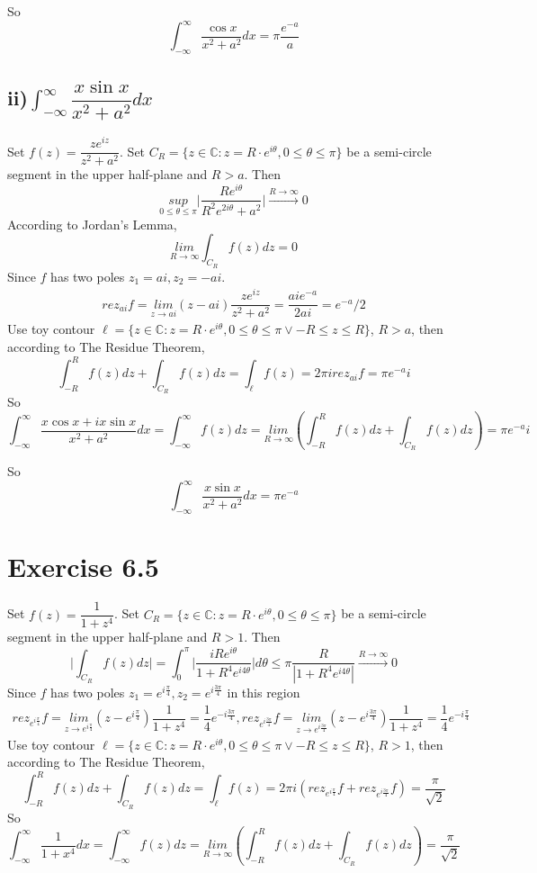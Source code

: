 \documentclass[a4paper,12pt,titlepage]{article}
\begin{document}
So $$\int_{-\infty}^{\infty}\dfrac{\cos x}{x^2+a^2}dx=\pi \dfrac{e^{-a}}{a}$$

\subsection*{ii)$\int_{-\infty}^{\infty}  \dfrac{x\sin x}{x^2+a^2}dx$}
Set $f(z)=\dfrac{ze^{iz}}{z^2+a^2}$. 
Set $C_R = \lbrace z \in \mathbb{C}: z = R\cdot e^{i\theta}, 0 \leqslant \theta \leqslant \pi\rbrace$ be a semi-circle segment in the upper half-plane and $R>a$. Then
$$\underset{0\leqslant \theta\leqslant\pi}{sup}
\big|\dfrac{Re^{i\theta}}{R^2e^{2i\theta}+a^2}\big|\xrightarrow{R\rightarrow\infty}0$$
According to Jordan's Lemma, 
$$\underset{R\rightarrow \infty}{lim}\int_{C_R}f(z)dz=0$$
Since $f$ has two poles $z_1=ai,z_2=-ai$.
\begin{align*}
rez_{ai}f=\underset{z\rightarrow ai}{lim}
(z-ai)\dfrac{ze^{iz}}{z^2+a^2}=\dfrac{aie^{-a}}{2ai}=e^{-a}/2
\end{align*}
Use toy contour $\ell= \lbrace z \in \mathbb{C}: z = R\cdot e^{i\theta}, 0 \leqslant \theta \leqslant \pi \vee -R\leqslant z\leqslant R\rbrace$, $R>a$, then according to The Residue Theorem, 
$$\int_{-R}^Rf(z)dz+\int_{C_R}f(z)dz=\int_{\ell}f(z)=2\pi irez_{ai}f=\pi e^{-a}i$$
So
$$\int_{-\infty}^{\infty}\dfrac{x\cos x+ix\sin x}{x^2+a^2}dx=\int_{-\infty}^{\infty}f(z)dz=\underset{R\rightarrow \infty}{lim}(\int_{-R}^Rf(z)dz+\int_{C_R}f(z)dz)=\pi e^{-a}i$$

So $$\int_{-\infty}^{\infty}\dfrac{x\sin x}{x^2+a^2}dx=\pi e^{-a}$$

\section*{Exercise 6.5}
Set $f(z)=\dfrac{1}{1+z^4}$. 
Set $C_R = \lbrace z \in \mathbb{C}: z = R\cdot e^{i\theta}, 0 \leqslant \theta \leqslant \pi\rbrace$ be a semi-circle segment in the upper half-plane and $R>1$. Then
$$\Big|\int_{C_R}f(z)dz\Big|=\int_0^{\pi}\Big|\dfrac{iRe^{i\theta}}{1+R^4e^{i4\theta}}\Big|d\theta\leqslant\pi\dfrac{R}{|1+R^4e^{i4\theta}|} \xrightarrow{R\rightarrow\infty}0$$
Since $f$ has two poles $z_1=e^{i\frac{\pi}{4}},z_2=e^{i\frac{3\pi}{4}}$ in this region
\begin{align*}
rez_{e^{i\frac{\pi}{4}}}f=\underset{z\rightarrow e^{i\frac{\pi}{4}}}{lim}
(z-e^{i\frac{\pi}{4}})\dfrac{1}{1+z^4}=\dfrac{1}{4}e^{-i\frac{3\pi}{4}},
rez_{e^{i\frac{3\pi}{4}}}f=\underset{z\rightarrow e^{i\frac{3\pi}{4}}}{lim}
(z-e^{i\frac{3\pi}{4}})\dfrac{1}{1+z^4}=\dfrac{1}{4}e^{-i\frac{\pi}{4}}
\end{align*}
Use toy contour $\ell= \lbrace z \in \mathbb{C}: z = R\cdot e^{i\theta}, 0 \leqslant \theta \leqslant \pi \vee -R\leqslant z\leqslant R\rbrace$, $R>1$, then according to The Residue Theorem, 
$$\int_{-R}^Rf(z)dz+\int_{C_R}f(z)dz=\int_{\ell}f(z)=2\pi i(rez_{e^{i\frac{\pi}{4}}}f+rez_{e^{i\frac{3\pi}{4}}}f)=\dfrac{\pi}{\sqrt{2}}$$
So
$$\int_{-\infty}^{\infty}\dfrac{1}{1+x^4}dx=\int_{-\infty}^{\infty}f(z)dz=\underset{R\rightarrow \infty}{lim}(\int_{-R}^Rf(z)dz+\int_{C_R}f(z)dz)=\dfrac{\pi}{\sqrt{2}}$$
\end{document}
